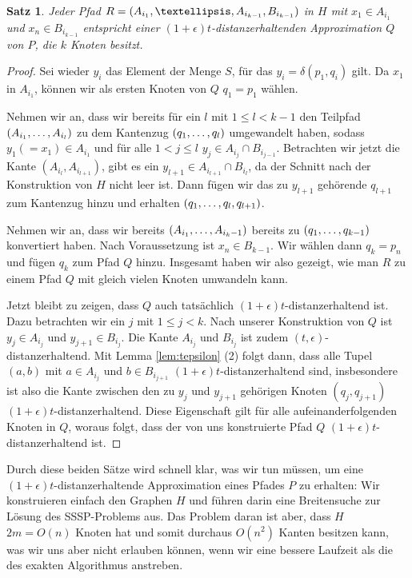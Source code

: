 \documentclass[11pt]{article}
\newtheorem{theorem}{Satz}[section]
\begin{document}
	\begin{theorem}
		\label{theo:H2Approx}
		Jeder Pfad $R = (A_{i_1}, \textellipsis, A_{i_{k-1}}, B_{i_{k-1}})$ in $H$ mit $x_1 \in A_{i_1}$ und $x_n \in B_{i_{k-1}}$ entspricht einer $(1+\epsilon)t$-distanzerhaltenden Approximation $Q$ von $P$, die $k$ Knoten besitzt.
	\end{theorem}
	\begin{proof}
		Sei wieder $y_i$ das Element der Menge $S$, für das $y_i = \delta(p_1, q_i)$ gilt.
		Da $x_1$ in $A_{i_1}$, können wir als ersten Knoten von $Q$ $q_1 = p_1$ wählen.
		
		Nehmen wir an, dass wir bereits für ein $l$ mit $1 \leq l < k-1$ den Teilpfad $(A_{i_1}, \mathellipsis, A_{i_l})$ zu dem Kantenzug $(q_1, \mathellipsis, q_l)$ umgewandelt haben, sodass $y_1 (= x_1) \in A_{i_1}$ und für alle $1 < j \leq l$ $y_j \in A_{i_j} \cap B_{i_{j-1}}$. Betrachten wir jetzt die Kante $(A_{i_l}, A_{i_{l+1}})$, gibt es ein $y_{l+1} \in A_{i_{l+1}} \cap B_{i_l}$, da der Schnitt nach der Konstruktion von $H$ nicht leer ist. Dann fügen wir das zu $y_{l+1}$ gehörende $q_{l+1}$ zum Kantenzug hinzu und erhalten $(q_1, \mathellipsis, q_l, q_{l+1})$.
		
		Nehmen wir an, dass wir bereits $(A_{i_1}, \mathellipsis, A_{i_k-1})$ bereits zu $(q_1, \mathellipsis, q_{k-1})$ konvertiert haben. Nach Voraussetzung ist $x_n \in B_{k-1}$. Wir wählen dann $q_k = p_n$ und fügen $q_k$ zum Pfad $Q$ hinzu. 
		Insgesamt haben wir also gezeigt, wie man $R$ zu einem Pfad $Q$ mit gleich vielen Knoten umwandeln kann. 
		
		Jetzt bleibt zu zeigen, dass $Q$ auch tatsächlich $(1+\epsilon)t$-distanzerhaltend ist.
		Dazu betrachten wir ein $j$ mit $1 \leq j < k$. Nach unserer Konstruktion von $Q$ ist $y_j \in A_{i_j}$ und $y_{j+1} \in B_{i_j}$. Die Kante $A_{i_j}$ und $B_{i_j}$ ist zudem $(t, \epsilon)$-distanzerhaltend. Mit Lemma \ref{lem:tepsilon} (2) folgt dann, dass alle Tupel $(a, b)$ mit $a \in A_{i_j}$ und $b \in B_{i_{j+1}}$ $(1+\epsilon)t$-distanzerhaltend sind, insbesondere ist also die Kante zwischen den zu $y_j$ und $y_{j+1}$ gehörigen Knoten $(q_j, q_{j+1})$ $(1+\epsilon)t$-distanzerhaltend. Diese Eigenschaft gilt für alle aufeinanderfolgenden Knoten in $Q$, woraus folgt, dass der von uns konstruierte Pfad $Q$ $(1+\epsilon)t$-distanzerhaltend ist.
	\end{proof}
    
    Durch diese beiden Sätze wird schnell klar, was wir tun müssen, um eine $(1+\epsilon)t$-distanzerhaltende Approximation eines Pfades $P$ zu erhalten: Wir konstruieren einfach den Graphen $H$ und führen darin eine Breitensuche zur Lösung des SSSP-Problems aus. Das Problem daran ist aber, dass $H$ $2m = O(n)$ Knoten hat und somit durchaus $O(n^2)$ Kanten besitzen kann, was wir uns aber nicht erlauben können, wenn wir eine bessere Laufzeit als die des exakten Algorithmus anstreben.
    
\end{document}

